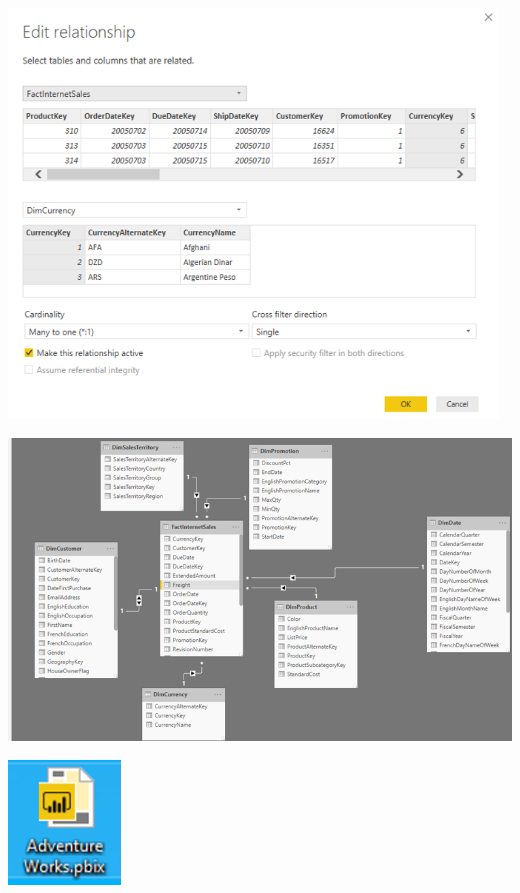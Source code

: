 \documentclass[12pt,letterpaper]{article}
\begin{document}
\begin{center}
\includegraphics[width=13cm]{images/4}\newline
\end{center}
\begin{center}
\includegraphics[width=\columnwidth]{images/5}\newline
\end{center}
\begin{center}
\includegraphics[width=3cm]{images/6}\newline
\end{center}
\end{document}
